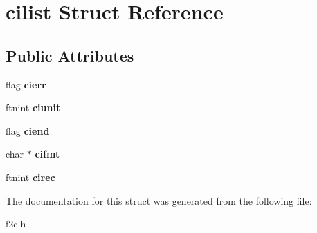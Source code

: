\hypertarget{structcilist}{
\section{cilist Struct Reference}
\label{structcilist}
}
\subsection*{Public Attributes}
\begin{DoxyCompactItemize}
\item 
\hypertarget{structcilist_aaa609be8bdf78a8fc7ba35b2ed0e6083}{
flag {\bfseries cierr}}
\label{structcilist_aaa609be8bdf78a8fc7ba35b2ed0e6083}

\item 
\hypertarget{structcilist_a3e5d0438673d14f5889fb6a3e712a076}{
ftnint {\bfseries ciunit}}
\label{structcilist_a3e5d0438673d14f5889fb6a3e712a076}

\item 
\hypertarget{structcilist_af16867fbc88cc3b26ecdedd0259fc5f5}{
flag {\bfseries ciend}}
\label{structcilist_af16867fbc88cc3b26ecdedd0259fc5f5}

\item 
\hypertarget{structcilist_a8c5159e1728cd9954138ecb392f04b8c}{
char $\ast$ {\bfseries cifmt}}
\label{structcilist_a8c5159e1728cd9954138ecb392f04b8c}

\item 
\hypertarget{structcilist_ace7c117f446a91e75e9f920fcff86546}{
ftnint {\bfseries cirec}}
\label{structcilist_ace7c117f446a91e75e9f920fcff86546}

\end{DoxyCompactItemize}


The documentation for this struct was generated from the following file:\begin{DoxyCompactItemize}
\item 
f2c.h\end{DoxyCompactItemize}
